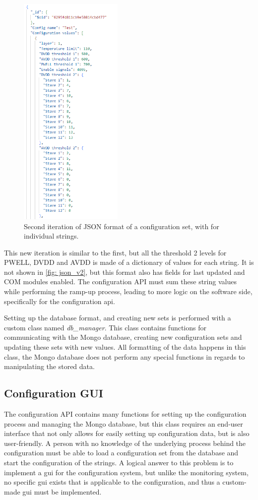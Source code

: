 \documentclass[main.tex]{subfiles}
\begin{document}
\begin{figure}[!ht]
    \centering
    \includegraphics[width=5cm, scale=1]{images/JSON_example_v2.png}
    \caption{Second iteration of JSON format of a configuration set, with for individual strings.}
    \label{fig: json_v2}
\end{figure}
\FloatBarrier

This new iteration is similar to the first, but all the threshold 2 levels for PWELL, DVDD and AVDD is made of a dictionary of values for each string. It is not shown in \autoref{fig: json_v2}, but this format also has fields for last updated and COM modules enabled. The configuration API must sum these string values while performing the ramp-up process, leading to more logic on the software side, specifically for the configuration \gls{api}.

Setting up the database format, and creating new sets is performed with a custom class named \textit{db\_manager}. This class contains functions for communicating with the Mongo database, creating new configuration sets and updating these sets with new values. All formatting of the data happens in this class, the Mongo database does not perform any special functions in regards to manipulating the stored data.



\subsection{Configuration GUI}  
\label{ssec: cgui}
The configuration API contains many functions for setting up the configuration process and managing the Mongo database, but this class requires an end-user interface that not only allows for easily setting up configuration data, but is also user-friendly. A person with no knowledge of the underlying process behind the configuration must be able to load a configuration set from the database and start the configuration of the strings. A logical answer to this problem is to implement a \gls{gui} for the configuration system, but unlike the monitoring system, no specific \gls{gui} exists that is applicable to the configuration, and thus a custom-made \gls{gui} must be implemented.
\end{document}

